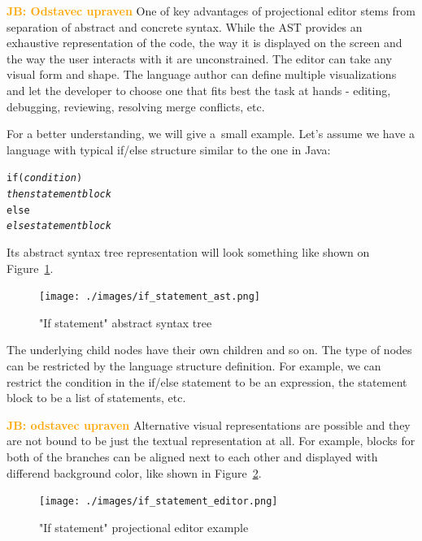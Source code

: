 \documentclass[10pt]{sigplanconf}
\newcommand{\JB}[1]{\textcolor{orange}{\bfseries JB: #1}} %
\begin{document}
\JB{Odstavec upraven} One of key advantages of projectional editor stems from separation of abstract and concrete syntax. While the AST provides an exhaustive representation of the code, the way it is displayed on the screen and the way the user interacts with it are unconstrained. The editor can take any visual form and shape. The language author can define multiple visualizations and let the developer to choose one that fits best the task at hands - editing, debugging, reviewing, resolving merge conflicts, etc.

For a better understanding, we will give a~small example. Let's assume we have a language with typical if/else structure similar to the one in Java:

\begin{center}
	\begin{minipage}{.38\textwidth}
		\begin{alltt}
			if (\textit{condition})
			    \textit{then statement block}
			else
			    \textit{else statement block}
		\end{alltt}
	\end{minipage}
\end{center}

Its abstract syntax tree representation will look something like shown on Figure~\ref{fig:if_ast}.

\begin{figure}[ht]
  \centering
  \texttt{[image: ./images/if\_statement\_ast.png]}
  \caption{"If statement" abstract syntax tree}
  \label{fig:if_ast}
\end{figure}

The underlying child nodes have their own children and so on. The type of nodes can be restricted by the language structure definition. For example, we can restrict the condition in the if/else statement to be an expression, the statement block to be a list of statements, etc.

\JB{odstavec upraven} Alternative visual representations are possible and they are not bound to be just the textual representation at all. For example, blocks for both of the branches can be aligned next to each other and displayed with differend background color, like shown in Figure~\ref{fig:if_editor}.

\begin{figure}[ht]
	\centering
	\hspace{-4mm}
	\texttt{[image: ./images/if\_statement\_editor.png]}
	\caption{"If statement" projectional editor example}
	\label{fig:if_editor}
\end{figure}
\end{document}
